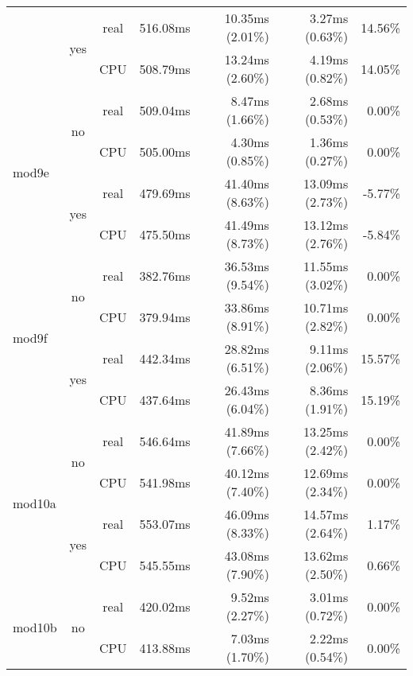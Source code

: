 \documentclass[en]{pracamgr}
\begin{document}
\begin{small}
\begin{longtable}{|l|c|c|r|r|r|r|}
                          \cline{2-7}
                          & \multirow{2}{*}{yes} & real & 516.08ms & 10.35ms (2.01\%) & 3.27ms (0.63\%) & 14.56\% \\*
                          &                      & CPU  & 508.79ms & 13.24ms (2.60\%) & 4.19ms (0.82\%) & 14.05\% \\
\hline
\multirow{4}{*}{mod9e}    & \multirow{2}{*}{no}  & real & 509.04ms & 8.47ms (1.66\%) & 2.68ms (0.53\%) & 0.00\% \\*
                          &                      & CPU  & 505.00ms & 4.30ms (0.85\%) & 1.36ms (0.27\%) & 0.00\% \\*
                          \cline{2-7}
                          & \multirow{2}{*}{yes} & real & 479.69ms & 41.40ms (8.63\%) & 13.09ms (2.73\%) & -5.77\% \\*
                          &                      & CPU  & 475.50ms & 41.49ms (8.73\%) & 13.12ms (2.76\%) & -5.84\% \\
\hline
\multirow{4}{*}{mod9f}    & \multirow{2}{*}{no}  & real & 382.76ms & 36.53ms (9.54\%) & 11.55ms (3.02\%) & 0.00\% \\*
                          &                      & CPU  & 379.94ms & 33.86ms (8.91\%) & 10.71ms (2.82\%) & 0.00\% \\*
                          \cline{2-7}
                          & \multirow{2}{*}{yes} & real & 442.34ms & 28.82ms (6.51\%) & 9.11ms (2.06\%) & 15.57\% \\*
                          &                      & CPU  & 437.64ms & 26.43ms (6.04\%) & 8.36ms (1.91\%) & 15.19\% \\
\hline
\multirow{4}{*}{mod10a}   & \multirow{2}{*}{no}  & real & 546.64ms & 41.89ms (7.66\%) & 13.25ms (2.42\%) & 0.00\% \\*
                          &                      & CPU  & 541.98ms & 40.12ms (7.40\%) & 12.69ms (2.34\%) & 0.00\% \\*
                          \cline{2-7}
                          & \multirow{2}{*}{yes} & real & 553.07ms & 46.09ms (8.33\%) & 14.57ms (2.64\%) & 1.17\% \\*
                          &                      & CPU  & 545.55ms & 43.08ms (7.90\%) & 13.62ms (2.50\%) & 0.66\% \\
\hline
\multirow{4}{*}{mod10b}   & \multirow{2}{*}{no}  & real & 420.02ms & 9.52ms (2.27\%) & 3.01ms (0.72\%) & 0.00\% \\*
                          &                      & CPU  & 413.88ms & 7.03ms (1.70\%) & 2.22ms (0.54\%) & 0.00\% \\*

\end{longtable}
\end{small}
\end{document}
